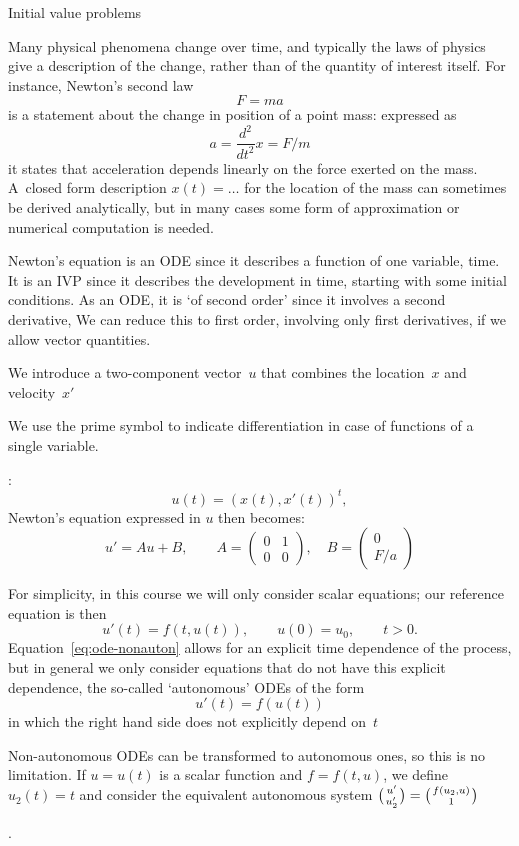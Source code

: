  {Initial value problems}
\label{sec:ode}

Many physical phenomena change over time, and typically the laws of
physics give a description of the change, rather than of the quantity
of interest itself. For instance, Newton's second law \[F=ma\] is a
statement about the change in position of a point mass: expressed as
\[ a=\frac{d^2}{dt^2}x=F/m \]
it states that acceleration depends linearly on the force exerted on
the mass. A~closed form description $x(t)=\ldots$ for the location of
the mass can sometimes be
derived analytically, but in many cases some form of approximation or
numerical computation is needed.

Newton's equation is an \ac{ODE} since it describes a function of one
variable, time. It is an \ac{IVP} since it describes the development
in time, starting with some initial conditions.  As an \ac{ODE}, it is
`of second order' since it involves a second derivative, We can reduce
this to first order, involving only first derivatives, if we allow
vector quantities. 

We introduce a two-component vector~$u$ that combines the location~$x$ and
velocity~$x'$~
\begin{footnoteenv}
  {We use the
  prime symbol to indicate differentiation in case of functions of a
  single variable.}
\end{footnoteenv}%
:
\[ u(t)=(x(t),x'(t))^t,\]
Newton's equation expressed in $u$ then becomes:
\[ u'=Au+B,\qquad A=
\begin{pmatrix}
  0&1\\ 0& 0
\end{pmatrix},\quad B=
\begin{pmatrix}
  0\\ F/a
\end{pmatrix}
\]

For simplicity, in this course we will only consider scalar equations;
our reference equation is then
\begin{equation} u'(t)=f(t,u(t)),\qquad u(0)=u_0,\qquad t>0.
    \label{eq:ode-nonauton}
\end{equation}
Equation~\eqref{eq:ode-nonauton} allows for an explicit time dependence
of the process, but in general we only consider equations that 
do not have this explicit dependence,
the  so-called `autonomous'  \acp{ODE} of the form
\begin{equation}
  \label{eq:ode}
  u'(t)=f(u(t))
\end{equation}
in which the right hand side does not explicitly depend
on~$t$
\begin{footnoteenv}
{Non-autonomous \ac{ODE}s can be transformed to autonomous
  ones, so this is no limitation. If $u=u(t)$ is a scalar function and
  $f=f(t,u)$, we define $u_2(t)=t$ and consider the equivalent
autonomous system $\big({u'\atop u'_2}\bigr)=\bigl({f(u_2,u)\atop
  1}\bigr)$}
\end{footnoteenv}%
.


